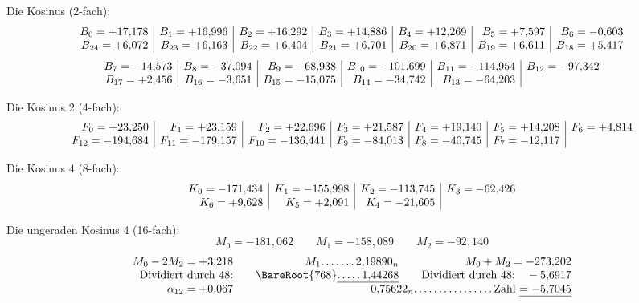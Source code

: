 \begin{landscape}
\[\]
\par\noindent\hspace*{\parindent}Die Kosinus (2-fach):
\[
\begin{array}{@{}r|r|r|r|r|r|r@{}}
B_0=+17{,}178&B_1=+16{,}996&B_2=+16{,}292&B_3=+14{,}886&B_4=+12{,}269&B_5=+7{,}597&B_6=-0{,}603\\
B_{24}=+6{,}072&B_{23}=+6{,}163&B_{22}=+6{,}404&B_{21}=+6{,}701&B_{20}=+6{,}871&B_{19}=+6{,}611&B_{18}=+5{,}417
\end{array}
\]
\[
\begin{array}{@{}r|r|r|r|r|r@{}}
B_7=-14{,}573&B_8=-37{,}094&B_9=-68{,}938&B_{10}=-101{,}699&B_{11}=-114{,}954&B_{12}=-97{,}342\\
B_{17}=+2{,}456&B_{16}=-3{,}651&B_{15}=-15{,}075&B_{14}=-34{,}742&B_{13}=-64{,}203&
\end{array}
\]
\par\noindent\hspace*{\parindent}Die Kosinus 2 (4-fach):
\[
\begin{array}{@{}r|r|r|r|r|r|r@{}}
F_0=+23{,}250&F_1=+23{,}159&F_2=+22{,}696&F_3=+21{,}587&F_4=+19{,}140&F_5=+14{,}208&F_6=+4{,}814\\
F_{12}=-194{,}684&F_{11}=-179{,}157&F_{10}=-136{,}441&F_9=-84{,}013&F_8=-40{,}745&F_7=-12{,}117&
\end{array}
\]
\newcommand{\VfourDots}[1]{\begingroup\count255=#1\relax\loop\mathord{.}\,\advance\count255 by -1\ifnum\count255>0\repeat\endgroup}
\clearpage{}
\par\noindent\hspace*{\parindent}Die Kosinus 4 (8-fach):
\[
\begin{array}{@{}r|r|r|r@{}}
K_0=-171{,}434&K_1=-155{,}998&K_2=-113{,}745&K_3=-62{,}426\\
K_6=+9{,}628&K_5=+2{,}091&K_4=-21{,}605&
\end{array}
\]
\par\noindent\hspace*{\parindent}Die ungeraden Kosinus 4 (16-fach):
\[M_0=-181{,}062\qquad M_1=-158{,}089\qquad M_2=-92{,}140\]
\[
\begin{array}{@{}r@{\qquad}r@{\qquad}r@{}}
M_0-2M_2=+3{,}218&M_1\VfourDots{6}2{,}19890_n&M_0+M_2=-273{,}202\\
\text{Dividiert durch 48:}&\BareRoot{768}\underline{\VfourDots{4}1{,}44268}&\text{Dividiert durch 48:}\quad-5{,}6917\\
\alpha_{12}=+0{,}067&\multicolumn{2}{r@{}}{0{,}75622_n\VfourDots{15}\text{Zahl}\ \underline{= -5{,}7045}}\\

\end{array}\]
\end{landscape}
